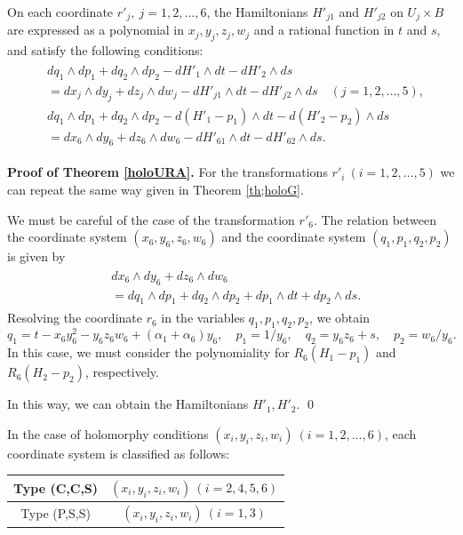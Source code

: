 \begin{prop} 
On each coordinate $r'_j, \ j=1,2,\dots,6$, the  Hamiltonians $H'_{j1}$ and $H'_{j2}$ on $U_j \times B$ are expressed as a polynomial in $x_j,y_j,z_j,w_j$ and a rational function in $t$ and $s$, and satisfy the following conditions{\rm: \rm}
\begin{align}
\begin{split}
&dq_1 \wedge dp_1 +dq_2 \wedge dp_2 - dH'_1 \wedge dt- dH'_2 \wedge ds\\
&=dx_j \wedge dy_j +dz_j \wedge dw_j - dH'_{j1} \wedge dt- dH'_{j2} \wedge ds \quad (j=1,2,\dots,5),\\
&dq_1 \wedge dp_1 +dq_2 \wedge dp_2 - d(H'_1-p_1) \wedge dt- d(H'_2-p_2) \wedge ds\\
&=dx_6 \wedge dy_6 +dz_6 \wedge dw_6 - dH'_{61} \wedge dt- dH'_{62} \wedge ds.
\end{split}
\end{align}
\end{prop}

\noindent
{\bf Proof of Theorem \ref{holoURA}.}
For the transformations $r'_i \ (i=1,2, \dots,5)$ we can repeat the same way given in Theorem \ref{th;holoG}.

We must be careful of the case of the transformation $r'_6$. The relation between the coordinate system $(x_6,y_6,z_6,w_6)$ and the coordinate system $(q_1,p_1,q_2,p_2)$ is given by
\begin{align}
\begin{split}
&dx_6 \wedge dy_6 +dz_6 \wedge dw_6\\
&=dq_1 \wedge dp_1 +dq_2 \wedge dp_2+dp_1 \wedge dt+dp_2 \wedge ds.
\end{split}
\end{align}
Resolving the coordinate $r_6$ in the variables $q_1,p_1,q_2,p_2$, we obtain
\begin{equation}\tag*{($R_6$)}
q_1=t-x_6y_6^2-y_6z_6w_6+(\alpha_1+\alpha_6)y_6, \quad p_1=1/y_6, \quad q_2=y_6z_6+s, \quad p_2=w_6/y_6.
\end{equation}
In this case, we must consider the polynomiality for $R_6(H_1-p_1)$ and $R_6(H_2-p_2)$, respectively.

In this way, we can obtain the Hamiltonians $H'_1,H'_2$. \qed

In the case of holomorphy conditions $(x_i,y_i,z_i,w_i) \ (i=1,2,\dots,6)$, each coordinate system is classified as follows:

\begin{center}
\begin{tabular}{|c|c|} \hline 
Type (C,C,S) & $(x_i,y_i,z_i,w_i) \ (i=2,4,5,6)$    \\ \hline 
Type (P,S,S) & $(x_i,y_i,z_i,w_i) \ (i=1,3)$    \\ \hline 
\end{tabular}
\end{center}


